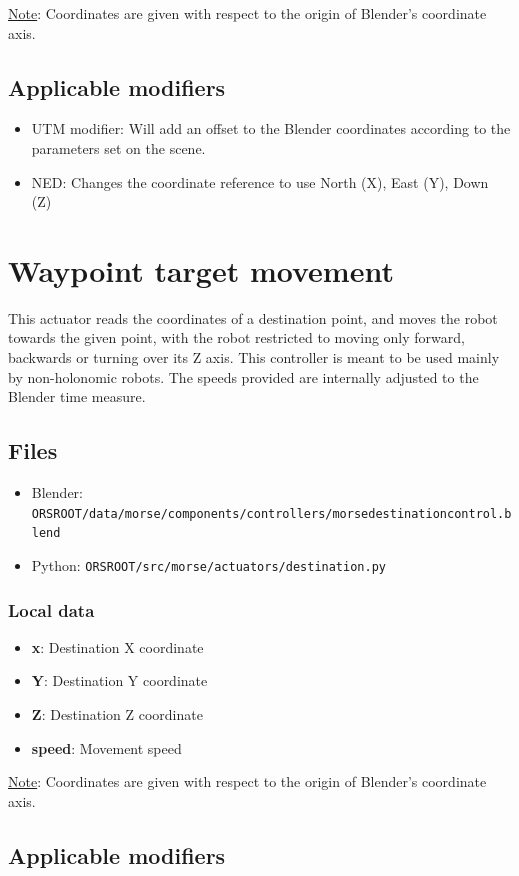 \documentclass[twoside,a4paper,10pt]{report}
\newcommand{\dokutitlelevelone}[1]{\chapter{#1}}
\newcommand{\dokutitleleveltwo}[1]{\section{#1}}
\newcommand{\dokutitleleveltree}[1]{\subsection{#1}}
\newcommand{\dokubold}[1]{\textbf{#1}}
\newcommand{\dokumonospace}[1]{\texttt{#1}}
\newcommand{\dokuunderline}[1]{\underline{#1}}
\newcommand{\dokuitem}{\item}
\begin{document}
\dokuunderline{Note}: Coordinates are given with respect to the origin of Blender's coordinate axis.


\dokutitleleveltwo{Applicable modifiers}
\label{e70c0c8fd69fbf29dc4de09110825004}%

\begin{itemize}
\dokuitem  UTM modifier: Will add an offset to the Blender coordinates according to the parameters set on the scene.
\end{itemize}

\begin{itemize}
\dokuitem  NED: Changes the coordinate reference to use North (X), East (Y), Down (Z)
\end{itemize}

\dokutitlelevelone{Waypoint target movement}
\label{e333de84c053461b128b58be1929db98}%
\label{f75862c2bd0040eb683048c313dcaaa8}%

This actuator reads the coordinates of a destination point, and moves the robot towards the given point, with the robot restricted to moving only forward, backwards or turning over its Z axis.
This controller is meant to be used mainly by non-holonomic robots.
The speeds provided are internally adjusted to the Blender time measure.


\dokutitleleveltwo{Files}
\label{45b963397aa40d4a0063e0d85e4fe7a1}%

\begin{itemize}
\dokuitem  Blender: \dokumonospace{{\textdollar}ORS{\textunderscore}ROOT/data/morse/components/controllers/morse{\textunderscore}destination{\textunderscore}control.blend}
\dokuitem  Python: \dokumonospace{{\textdollar}ORS{\textunderscore}ROOT/src/morse/actuators/destination.py}
\end{itemize}

\dokutitleleveltree{Local data}
\label{a53af9dae307d714362321cf5d55d89c}%

\begin{itemize}
\dokuitem  \dokubold{x}: Destination X coordinate
\dokuitem  \dokubold{Y}: Destination Y coordinate
\dokuitem  \dokubold{Z}: Destination Z coordinate
\dokuitem  \dokubold{speed}: Movement speed
\end{itemize}

\dokuunderline{Note}: Coordinates are given with respect to the origin of Blender's coordinate axis.


\dokutitleleveltwo{Applicable modifiers}
\label{e70c0c8fd69fbf29dc4de09110825004}%
\end{document}
